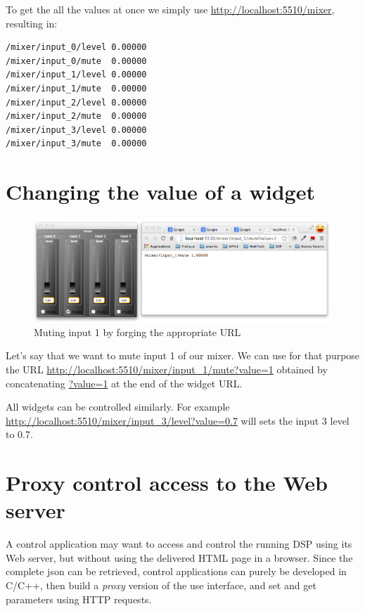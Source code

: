 To get the all the values at once we simply use \url{http://localhost:5510/mixer}, resulting in:
\begin{lstlisting}
/mixer/input_0/level 0.00000 
/mixer/input_0/mute  0.00000 
/mixer/input_1/level 0.00000 
/mixer/input_1/mute  0.00000 
/mixer/input_2/level 0.00000 
/mixer/input_2/mute  0.00000 
/mixer/input_3/level 0.00000 
/mixer/input_3/mute  0.00000 
\end{lstlisting}

\section{Changing the value of a widget}

\begin{figure}[h!]
  \centering
  \includegraphics[width=\textwidth]{images/mix4-http-mute.png}
  \caption{Muting input 1 by forging the appropriate URL}   
  \label{fig:mix4-http-mute}
\end{figure}

Let's say that we want to mute input 1 of our mixer. We can use for that purpose the URL \url{http://localhost:5510/mixer/input_1/mute?value=1} obtained by concatenating \url{?value=1} at the end of the widget URL. 

All widgets can be controlled similarly. For example \url{http://localhost:5510/mixer/input_3/level?value=0.7} will sets the input 3 level to 0.7.

\section{Proxy control access to the Web server}

A control application may want to access and control the running DSP using its Web server, but without using the delivered HTML page in a browser. Since the complete json can be retrieved,  control applications can purely be developed in C/C++, then build a \textit{proxy} version of the use interface, and set and get parameters using HTTP requests. 


